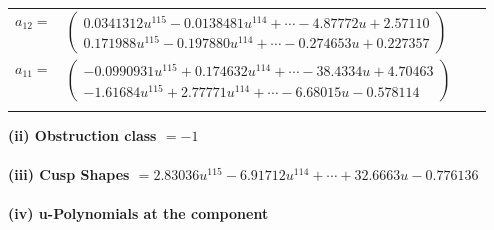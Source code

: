 \documentclass[1p]{elsarticle_modified}
\theoremstyle{definition}
\begin{document}
\begin{tabular}{m{7pt} m{180pt} m{7pt} m{180pt} }
\flushright $a_{12}=$&$\begin{pmatrix}0.0341312 u^{115}-0.0138481 u^{114}+\cdots-4.87772 u+2.57110\\0.171988 u^{115}-0.197880 u^{114}+\cdots-0.274653 u+0.227357\end{pmatrix}$ \\
\flushright $a_{11}=$&$\begin{pmatrix}-0.0990931 u^{115}+0.174632 u^{114}+\cdots-38.4334 u+4.70463\\-1.61684 u^{115}+2.77771 u^{114}+\cdots-6.68015 u-0.578114\end{pmatrix}$\\&\end{tabular}
\flushleft \textbf{(ii) Obstruction class $= -1$}\\~\\
\flushleft \textbf{(iii) Cusp Shapes $= 2.83036 u^{115}-6.91712 u^{114}+\cdots+32.6663 u-0.776136$}\\~\\
\newpage\renewcommand{\arraystretch}{1}
\flushleft \textbf{(iv) u-Polynomials at the component}\newline \\
\end{document}
